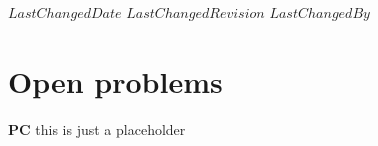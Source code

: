 {$LastChangedDate$}
{$LastChangedRevision$} {$LastChangedBy$}


\chapter{Open problems}
\label{chap:open}

{\bf PC}{ this is just a placeholder}

